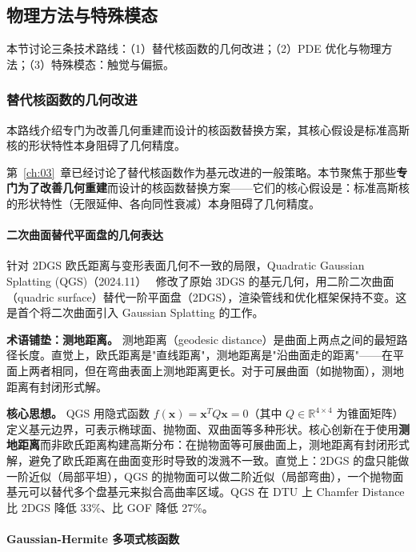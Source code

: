 \subsection{物理方法与特殊模态}
\label{ss:04_6b}

本节讨论三条技术路线：（1）替代核函数的几何改进；（2）PDE 优化与物理方法；（3）特殊模态：触觉与偏振。

\subsubsection{替代核函数的几何改进}

本路线介绍专门为改善几何重建而设计的核函数替换方案，其核心假设是标准高斯核的形状特性本身阻碍了几何精度。

第~\ref{ch:03}~章已经讨论了替代核函数作为基元改进的一般策略。本节聚焦于那些\textbf{专门为了改善几何重建}而设计的核函数替换方案——它们的核心假设是：标准高斯核的形状特性（无限延伸、各向同性衰减）本身阻碍了几何精度。

\paragraph{二次曲面替代平面盘的几何表达}

针对 2DGS 欧氏距离与变形表面几何不一致的局限，Quadratic Gaussian Splatting (QGS)（2024.11）~\cite{2411_16392} 修改了原始 3DGS 的基元几何，用二阶二次曲面（quadric surface）替代一阶平面盘（2DGS），渲染管线和优化框架保持不变。这是首个将二次曲面引入 Gaussian Splatting 的工作。

\textbf{术语铺垫：测地距离。} 测地距离（geodesic distance）是曲面上两点之间的最短路径长度。直觉上，欧氏距离是"直线距离"，测地距离是"沿曲面走的距离"——在平面上两者相同，但在弯曲表面上测地距离更长。对于可展曲面（如抛物面），测地距离有封闭形式解。

\textbf{核心思想。} QGS 用隐式函数 $f(\mathbf{x}) = \mathbf{x}^T Q \mathbf{x} = 0$（其中 $Q \in \mathbb{R}^{4\times4}$ 为锥面矩阵）定义基元边界，可表示椭球面、抛物面、双曲面等多种形状。核心创新在于使用\textbf{测地距离}而非欧氏距离构建高斯分布：在抛物面等可展曲面上，测地距离有封闭形式解，避免了欧氏距离在曲面变形时导致的泼溅不一致。直觉上：2DGS 的盘只能做一阶近似（局部平坦），QGS 的抛物面可以做二阶近似（局部弯曲），一个抛物面基元可以替代多个盘基元来拟合高曲率区域。QGS 在 DTU 上 Chamfer Distance 比 2DGS 降低 33\%、比 GOF 降低 27\%。

\paragraph{Gaussian-Hermite 多项式核函数}

